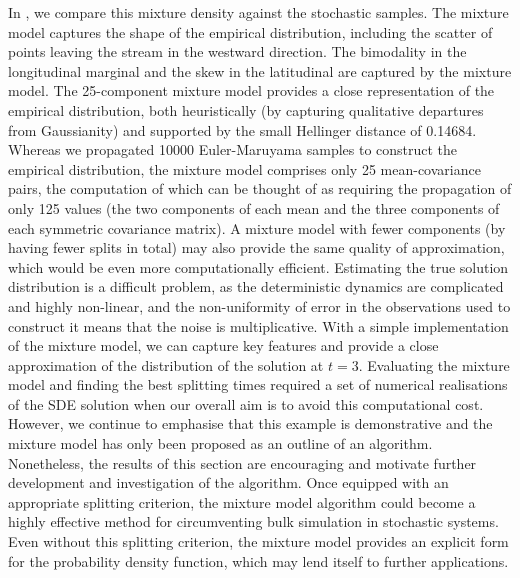 In , we compare this mixture density against the stochastic samples.
The mixture model captures the shape of the empirical distribution, including the scatter of points leaving the stream in the westward direction.
The bimodality in the longitudinal marginal and the skew in the latitudinal are captured by the mixture model.
The 25-component mixture model provides a close representation of the empirical distribution, both heuristically (by capturing qualitative departures from Gaussianity) and supported by the small Hellinger distance of 0.14684.
Whereas we propagated 10000 Euler-Maruyama samples to construct the empirical distribution, the mixture model comprises only 25 mean-covariance pairs, the computation of which can be thought of as requiring the propagation of only 125 values (the two components of each mean and the three components of each symmetric covariance matrix).
A mixture model with fewer components (by having fewer splits in total) may also provide the same quality of approximation, which would be even more computationally efficient.
Estimating the true solution distribution is a difficult problem, as the deterministic dynamics are complicated and highly non-linear, and the non-uniformity of error in the observations used to construct it means that the noise is multiplicative.
With a simple implementation of the mixture model, we can capture key features and provide a close approximation of the distribution of the solution at \(t = 3\).
Evaluating the mixture model and finding the best splitting times required a set of numerical realisations of the SDE solution when our overall aim is to avoid this computational cost.
However, we continue to emphasise that this example is demonstrative and the mixture model has only been proposed as an outline of an algorithm.
Nonetheless, the results of this section are encouraging and motivate further development and investigation of the algorithm.
Once equipped with an appropriate splitting criterion, the mixture model algorithm could become a highly effective method for circumventing bulk simulation in stochastic systems.
Even without this splitting criterion, the mixture model provides an explicit form for the probability density function, which may lend itself to further applications.



